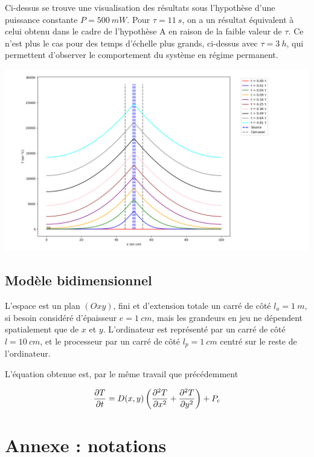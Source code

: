 \documentclass{article}
\begin{document}
Ci-dessus se trouve une visualisation des résultats sous l'hypothèse d'une puissance constante $P = \SI{500}{mW}$. Pour $\tau = \SI{11}{s}$, on a un résultat équivalent à celui obtenu dans le cadre de l'hypothèse A en raison de la faible valeur de $\tau$. Ce n'est plus le cas pour des temps d'échelle plus grands, ci-dessus avec $\tau = \SI{3}{h}$, qui permettent d'observer le comportement du système en régime permanent.

\includegraphics[scale=0.37]{1dB_P500mW_t11000s.png}


\subsection{Modèle bidimensionnel}

L'espace est un plan $(Oxy)$, fini et d'extension totale un carré de côté $l_a = \SI{1}{m}$, si besoin considéré d'épaisseur $e = \SI{1}{cm}$, mais les grandeurs en jeu ne dépendent spatialement que de $x$ et $y$. L'ordinateur est représenté par un carré de côté $l = \SI{10}{cm}$, et le processeur par un carré de côté $l_p = \SI{1}{cm}$ centré sur le reste de l'ordinateur.


L'équation obtenue est, par le même travail que précédemment

$$\pdv{T}{t} = D(x, y) \left( \pdv[2]{T}{x} + \pdv[2]{T}{y} \right)+ P_c$$

\section*{Annexe : notations}
\end{document}
